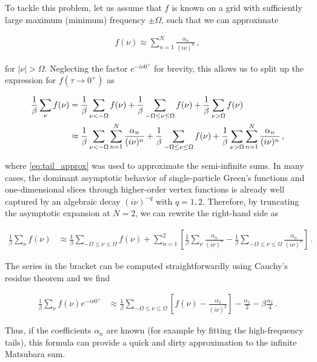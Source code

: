 \documentclass{SciPost}
\begin{document}
\begin{appendix}
To tackle this problem, let us assume that $f$ is known on a grid with sufficiently large maximum (minimum) frequency $\pm \Omega$, such that we can approximate
%
\begin{linenomath}
    \begin{align}
        f(\nu) \approx \sum_{n = 1}^{N} \frac{\alpha_n}{(i\nu)^n} \,,
        \label{eq:tail_approx}
    \end{align}
\end{linenomath}
%
for $|\nu| > \Omega$. Neglecting the factor $e^{-i\nu0^+}$ for brevity, this allows us to split up the expression for $f(\tau \to 0^+)$ as
%
\begin{linenomath}
    \begin{align}
        \frac{1}{\beta} \sum_{\nu} f(\nu) &= \frac{1}{\beta} \sum_{\nu < -\Omega} f(\nu) + \frac{1}{\beta} \sum_{-\Omega \leq \nu \leq \Omega} f(\nu) + \frac{1}{\beta} \sum_{\nu > \Omega} f(\nu) \notag \\
        &\approx \frac{1}{\beta} \sum_{\nu < -\Omega} \sum_{n = 1}^{N} \frac{\alpha_n}{(i\nu)^n} + \frac{1}{\beta} \sum_{-\Omega \leq \nu \leq \Omega} f(\nu) + \frac{1}{\beta} \sum_{\nu > \Omega} \sum_{n = 1}^{N} \frac{\alpha_n}{(i\nu)^n} \,,
    \end{align}
\end{linenomath}
%
where \eqref{eq:tail_approx} was used to approximate the semi-infinite sums. In many cases, the dominant asymptotic behavior of single-particle Green’s functions and one-dimensional slices through higher-order vertex functions is already well captured by an algebraic decay $(i\nu)^{-q}$ with $q = 1, 2$. Therefore, by truncating the asymptotic expansion at $N = 2$, we can rewrite the right-hand side as 
%
\begin{linenomath}
    \begin{align}
        \frac{1}{\beta} \sum_{\nu} f(\nu) &\approx \frac{1}{\beta} \sum_{-\Omega \leq \nu \leq \Omega} f(\nu) + \sum_{n = 1}^{2} \left[ \frac{1}{\beta} \sum_{\nu} \frac{\alpha_n}{(i\nu)^n} - \frac{1}{\beta} \sum_{-\Omega \leq \nu \leq \Omega} \frac{\alpha_n}{(i\nu)^n} \right] \,.
    \end{align}
\end{linenomath}
%
The series in the bracket can be computed straightforwardly using Cauchy's residue theorem and we find
%
\begin{linenomath}
    \begin{align}
        \frac{1}{\beta} \sum_{\nu} f(\nu) e^{-i\nu 0^+} &\approx \frac{1}{\beta} \sum_{-\Omega \leq \nu \leq \Omega} \left[f(\nu) - \frac{\alpha_2}{(i\nu)^2} \right] - \frac{\alpha_1}{2} - \beta \frac{\alpha_2}{4} \,.
    \end{align}
\end{linenomath}
%
Thus, if the coefficients $\alpha_n$ are known (for example by fitting the high-frequency tails), this formula can provide a quick and dirty approximation to the infinite Matsubara sum.


\end{appendix}
\end{document}
